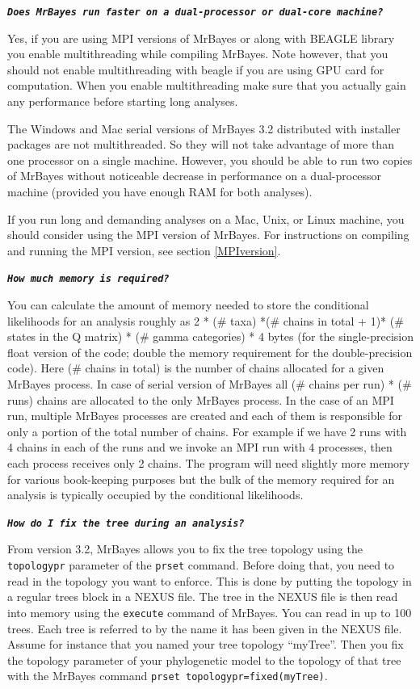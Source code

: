 \documentclass[12pt]{book}
\newcommand{\tb}[1]{\texttt{\textbf{#1}} }
\begin{document}
\tb{\it{Does MrBayes run faster on a dual-processor or dual-core machine?}}

Yes, if you are using MPI versions of MrBayes or along with BEAGLE library you enable
multithreading while compiling MrBayes. Note however, that you should not enable multithreading
with beagle if you are using GPU card for computation. When you enable multithreading make sure
that you actually gain any performance before starting long analyses.

The Windows and Mac serial versions of MrBayes 3.2 distributed with installer packages are not
multithreaded. So they will not take advantage of more than one processor on a single machine.
However, you should be able to run two copies of MrBayes without noticeable decrease in performance
on a dual-processor machine (provided you have enough RAM for both analyses).

If you run long and demanding analyses on a Mac, Unix, or Linux machine, you should consider using
the MPI version of MrBayes. For instructions on compiling and running the MPI version, see section
\ref{MPIversion}.

\tb{\it{How much memory is required?}}

You can calculate the amount of memory needed to store the conditional likelihoods for an analysis
roughly as 2 * (\# taxa) *(\# chains in total + 1)* (\# states in the Q matrix) * (\# gamma
categories) * 4 bytes (for the single-precision float version of the code; double the memory
requirement for the double-precision code). Here (\# chains in total) is the number of chains
allocated for a given MrBayes process. In case of serial version of MrBayes all (\# chains per run)
* (\# runs) chains are allocated to the only MrBayes process. In the case of an MPI run, multiple
MrBayes processes are created and each of them is responsible for only a portion of the total
number of chains. For example if we have 2 runs with 4 chains in each of the runs and we invoke an
MPI run with 4 processes, then each process receives only 2 chains.  The program will need slightly
more memory for various book-keeping purposes but the bulk of the memory required for an analysis
is typically occupied by the conditional likelihoods.

\tb{\it{How do I fix the tree during an analysis?}}

From version 3.2, MrBayes allows you to fix the tree topology using the \texttt{topologypr}
parameter of the \texttt{prset} command. Before doing that, you need to read in the topology you
want to enforce. This is done by putting the topology in a regular trees block in a NEXUS file. The
tree in the NEXUS file is then read into memory using the \texttt{execute} command of MrBayes. You
can read in up to 100 trees. Each tree is referred to by the name it has been given in the NEXUS
file. Assume for instance that you named your tree topology ``myTree''. Then you fix the topology
parameter of your phylogenetic model to the topology of that tree with the MrBayes command
\texttt{prset topologypr=fixed(myTree)}.
\end{document}

